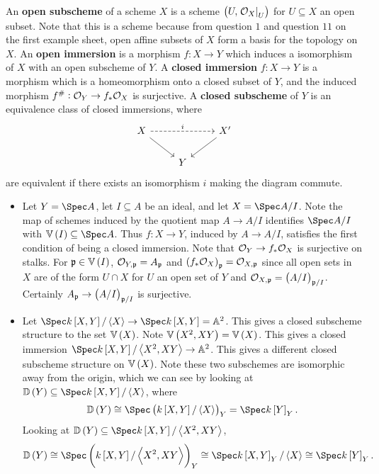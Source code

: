 \begin{definition*}
An \textbf{open subscheme} of a scheme $ X $ is a scheme $ \br{U, \eval{\OOO_X}_U} $ for $ U \subseteq X $ an open subset. Note that this is a scheme because from question $ 1 $ and question $ 11 $ on the first example sheet, open affine subsets of $ X $ form a basis for the topology on $ X $. An \textbf{open immersion} is a morphism $ f : X \to Y $ which induces a isomorphism of $ X $ with an open subscheme of $ Y $. A \textbf{closed immersion} $ f : X \to Y $ is a morphism which is a homeomorphism onto a closed subset of $ Y $, and the induced morphism $ f^\# : \mathcal{O}_Y \to f_*\mathcal{O}_X $ is surjective. A \textbf{closed subscheme} of $ Y $ is an equivalence class of closed immersions, where
$$
\begin{tikzcd}
X \arrow[dashed]{rr}{i} \arrow{dr} & & X' \arrow{dl} \\
& Y &
\end{tikzcd}
$$
are equivalent if there exists an isomorphism $ i $ making the diagram commute.
\end{definition*}

\begin{example*}
\hfill
\begin{itemize}
\item Let $ Y = \Spec A $, let $ I \subseteq A $ be an ideal, and let $ X = \Spec A / I $. Note the map of schemes induced by the quotient map $ A \to A / I $ identifies $ \Spec A / I $ with $ \VV\br{I} \subseteq \Spec A $. Thus $ f : X \to Y $, induced by $ A \to A / I $, satisfies the first condition of being a closed immersion. Note that $ \mathcal{O}_Y \to f_*\mathcal{O}_X $ is surjective on stalks. For $ \ppp \in \VV\br{I} $, $ \mathcal{O}_{Y, \mathfrak{p}} = A_{\mathfrak{p}} $ and $ \br{f_*\OOO_X}_\ppp = \OOO_{X, \ppp} $ since all open sets in $ X $ are of the form $ U \cap X $ for $ U $ an open set of $ Y $ and $ \OOO_{X, \ppp} = \br{A / I}_{\ppp / I} $. Certainly $ A_\ppp \to \br{A / I}_{\ppp / I} $ is surjective.
\item Let $ \Spec k\sbr{X, Y} / \abr{X} \to \Spec k\sbr{X, Y} = \AA^2 $. This gives a closed subscheme structure to the set $ \VV\br{X} $. Note $ \VV\br{X^2, XY} = \VV\br{X} $. This gives a closed immersion $ \Spec k\sbr{X, Y} / \abr{X^2, XY} \to \AA^2 $. This gives a different closed subscheme structure on $ \VV\br{X} $. Note these two subschemes are isomorphic away from the origin, which we can see by looking at $ \DD\br{Y} \subseteq \Spec k\sbr{X, Y} / \abr{X} $, where
$$ \DD\br{Y} \cong \Spec \br{k\sbr{X, Y} / \abr{X}}_Y = \Spec k\sbr{Y}_Y. $$
Looking at $ \DD\br{Y} \subseteq \Spec k\sbr{X, Y} / \abr{X^2, XY} $,
$$ \DD\br{Y} \cong \Spec \br{k\sbr{X, Y} / \abr{X^2, XY}}_Y \cong \Spec k\sbr{X, Y}_Y / \abr{X} \cong \Spec k\sbr{Y}_Y. $$
\end{itemize}
\end{example*}

